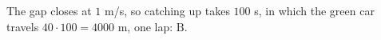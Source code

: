The gap closes at $1$ m/s, so catching up takes $100$ s, in which the green car travels $40\cdot100=4000$ m, one lap: $\boxed{\text{B}}$.
